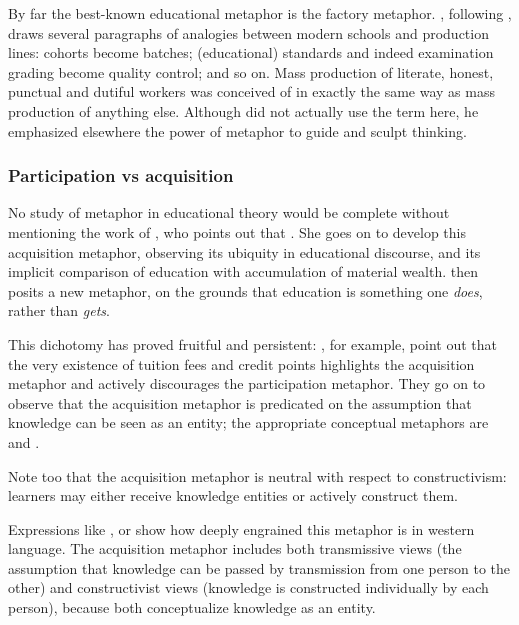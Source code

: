 By far the best-known educational metaphor is the factory metaphor.
, following , draws several
paragraphs of analogies between modern schools and production lines:
cohorts become batches; (educational) standards and indeed examination
grading become quality control; and so on.  Mass production of
literate, honest, punctual and dutiful workers was conceived of in
exactly the same way as mass production of anything else.  Although
\citeauthor{claxton2013} did not actually use the term
 here, he emphasized elsewhere the power
of metaphor to guide and sculpt thinking.

\subsubsection*{Participation vs acquisition}

No study of metaphor in educational theory would be complete without
mentioning the work of , who points out that
.  She goes on to develop this acquisition
metaphor, observing its ubiquity in educational discourse, and its
implicit comparison of education with accumulation of material wealth.
\citeauthor{sfard1998} then posits a new 
metaphor, on the grounds that education is something one {\em does},
rather than {\em gets}.

This dichotomy has proved fruitful and persistent: ,
for example, point out that the very existence of tuition fees and
credit points highlights the acquisition metaphor and actively
discourages the participation metaphor.  They go on to observe that
the acquisition metaphor is predicated on the assumption that
knowledge can be seen as an entity; the appropriate conceptual
metaphors are  and .

Note too that the acquisition metaphor is neutral with respect to
constructivism: learners may either receive knowledge entities or
actively construct them.

Expressions like ,
 or
 show how deeply engrained this
metaphor is in western language.  The acquisition metaphor includes
both transmissive views (the assumption that knowledge can be passed
by transmission from one person to the other) and constructivist views
(knowledge is constructed individually by each person), because both
conceptualize knowledge as an entity.


